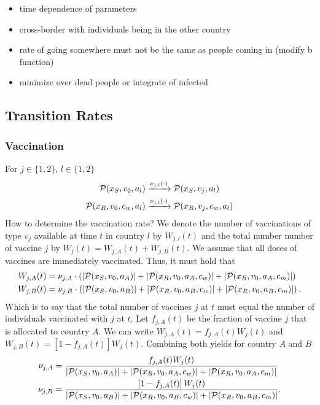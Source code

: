 \begin{itemize}
\item time dependence of parameters
\item cross-border with individuals being in the other country
\item rate of going somewhere must not be the same as people coming in (modify b function)
\item minimize over dead people or integrate of infected
\end{itemize}

\subsection{Transition Rates}

\subsubsection*{Vaccination}
For $j \in \{1,2\}$, $l \in \{1,2\}$
\begin{align*}
\mathcal{P}(x_S, v_0, a_l) &\xrightarrow{\nu_{j,l}(\cdot)} \mathcal{P}(x_S, v_j, a_l) \notag \\
\mathcal{P}(x_R, v_0, c_w, a_l) &\xrightarrow{\nu_{j,l}(\cdot)} \mathcal{P}(x_R, v_j, c_w, a_l)
\end{align*}
How to determine the vaccination rate? We denote the number of vaccinations of type $v_j$ available at time $t$ in country $l$ by $W_{j,l}(t)$ and the total number number of vaccine $j$ by $W_j(t) = W_{j,A}(t) + W_{j,B}(t)$. We assume that all doses of vaccines are immediately vaccinated. Thus, it must hold that 
\begin{align*}
W_{j,A}(t) &= \nu_{j, A} \cdot \left( |\mathcal{P}(x_S, v_0, a_A)| + |\mathcal{P}(x_R, v_0, a_A, c_w)| + |\mathcal{P}(x_R, v_0, a_A, c_m)| \right) \notag \\
W_{j,B}(t) &= \nu_{j, B} \cdot \left( |\mathcal{P}(x_S, v_0, a_B)| + |\mathcal{P}(x_R, v_0, a_B, c_w)| + |\mathcal{P}(x_R, v_0, a_B, c_m)| \right). 
\end{align*}
Which is to say that the total number of vaccines $j$ at $t$ must equal the number of individuals vaccinated with $j$ at $t$. Let $f_{j,A}(t)$ be the fraction of vaccine $j$ that is allocated to country $A$. We can write $W_{j,A}(t) = f_{j,A}(t) W_j(t)$ and $W_{j,B}(t) = \left[1 - f_{j,A}(t)\right] W_j(t)$. Combining both yields for country $A$ and $B$
\begin{align*}
\nu_{j,A} &= \frac{ f_{j,A}(t) W_{j}(t)}{|\mathcal{P}(x_S, v_0, a_A)| + |\mathcal{P}(x_R, v_0, a_A, c_w)| + |\mathcal{P}(x_R, v_0, a_A, c_m)|} \notag \\
\nu_{j,B} &= \frac{\left[1 - f_{j,A}(t)\right]  W_{j}(t)}{|\mathcal{P}(x_S, v_0, a_B)| + |\mathcal{P}(x_R, v_0, a_B, c_w)| + |\mathcal{P}(x_R, v_0, a_B, c_m)|}.
\end{align*}
